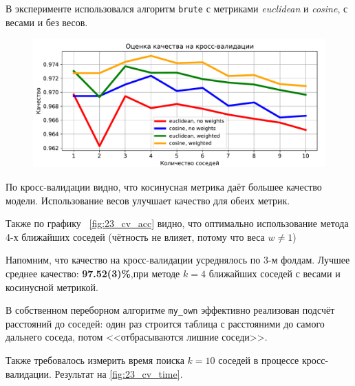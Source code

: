 \documentclass[12pt]{article}
\begin{document}
В эксперименте использовался алгоритм \verb|brute| с метриками \emph{euclidean} и \emph{cosine}, с весами и без весов.

\begin{figure}[!h]
    \includegraphics[width=\textwidth]{23_cv_acc.pdf}
    \caption{}
    \label{fig:23_cv_acc}
\end{figure}
По кросс-валидации видно, что косинусная метрика даёт большее качество модели. Использование весов улучшает качество для обеих метрик.

Также по графику ~\autoref{fig:23_cv_acc} видно, что оптимально использование метода 4-х ближайших соседей (чётность не влияет, потому что веса $w \neq 1$)

Напомним, что качество на кросс-валидации усреднялось по 3-м фолдам. Лучшее среднее качество: \textbf{97.52(3)\%},при методе $k=4$ ближайших соседей с весами и косинусной метрикой.

В собственном переборном алгоритме \verb|my_own| эффективно реализован подсчёт расстояний до соседей: один раз строится таблица с расстояними до самого дальнего соседа, потом <<отбрасываются лишние соседи>>.

Также требовалось измерить время поиска $k = 10$ соседей в процессе кросс-валидации. Результат на \autoref{fig:23_cv_time}.
\end{document}
